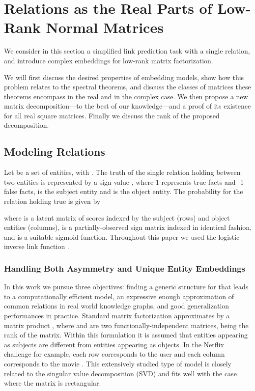 \documentclass[twoside,11pt]{article}
\renewcommand{\cite}{\citep}
\begin{document}
\section{Relations as the Real Parts of Low-Rank Normal Matrices}
\label{sec:mat_case}


We consider in this section a simplified link prediction task with a single relation,
and introduce complex embeddings for low-rank matrix factorization.

We will first discuss the desired properties of embedding models,
show how this problem relates to the spectral theorems, 
and discuss the classes of matrices
these theorems encompass in the real and in the complex case. 
We then propose a new matrix decomposition---to the best of our knowledge---and a 
proof of its existence for all real square matrices.
Finally we discuss the rank of the proposed decomposition.













\subsection{Modeling Relations}
Let  be a set of entities, with .
The truth of the single relation holding between two entities is represented by a sign value , where 1 represents true facts and -1 false facts,  is the subject entity and  is the object entity. The probability for the relation holding true is given by

where  is a latent matrix of scores indexed by the subject (rows) and object entities (columns),   is a partially-observed sign matrix indexed in identical fashion, and  is a suitable sigmoid function. Throughout this paper we used the logistic inverse link function .


\subsubsection{Handling Both Asymmetry and Unique Entity Embeddings}

In this work we pursue three objectives: finding a generic structure for  that leads to  a computationally efficient model,  an expressive enough approximation 
of common relations in real world knowledge graphs, and  good
generalization performances in practice.
Standard matrix factorization approximates  by 
a matrix product , where  and  are two functionally-independent  matrices,  being the rank of the matrix. Within this formulation it is assumed that entities appearing as subjects are different from entities appearing as objects. In the Netflix challenge \cite{koren_netflix} for example, each row  corresponds to the user  and each column  corresponds to the movie .
This extensively studied type of model is closely related to the singular value decomposition (SVD) and fits well with the case where the matrix  is rectangular. 
\end{document}
